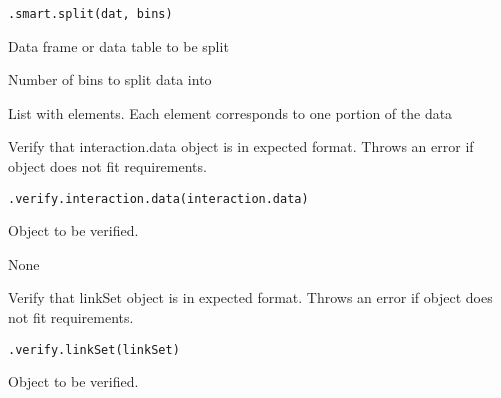 \documentclass[letterpaper]{book}
\begin{document}
%
\begin{Usage}
\begin{verbatim}
.smart.split(dat, bins)
\end{verbatim}
\end{Usage}
%
\begin{Arguments}
\begin{ldescription}
\item[\code{dat}] Data frame or data table to be split

\item[\code{bins}] Number of bins to split data into
\end{ldescription}
\end{Arguments}
%
\begin{Value}
List with  elements. Each element corresponds to one portion
of the data
\end{Value}
%
\begin{Description}
Verify that interaction.data object is in expected format. Throws an error if object does not fit requirements.
\end{Description}
%
\begin{Usage}
\begin{verbatim}
.verify.interaction.data(interaction.data)
\end{verbatim}
\end{Usage}
%
\begin{Arguments}
\begin{ldescription}
\item[\code{interaction.data}] Object to be verified.
\end{ldescription}
\end{Arguments}
%
\begin{Value}
None
\end{Value}
%
\begin{Description}
Verify that linkSet object is in expected format. Throws an error if object does not fit requirements.
\end{Description}
%
\begin{Usage}
\begin{verbatim}
.verify.linkSet(linkSet)
\end{verbatim}
\end{Usage}
%
\begin{Arguments}
\begin{ldescription}
\item[\code{linkSet}] Object to be verified.
\end{ldescription}
\end{Arguments}
\end{document}
